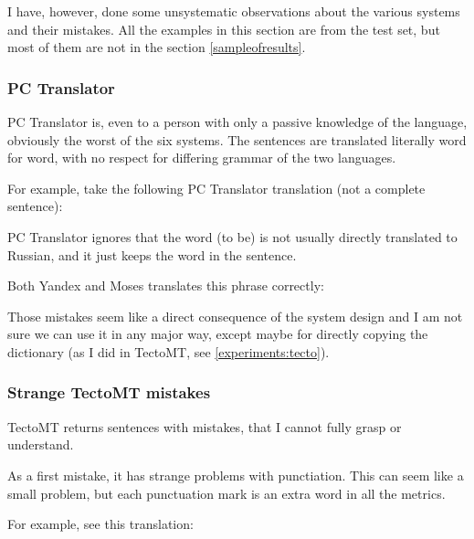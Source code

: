 I have, however, done some unsystematic observations about the various systems and their mistakes. All the examples in this section are from the test set, but most of them are not in the section \ref{sampleofresults}.
\subsubsection{PC Translator}
PC Translator is, even to a person with only a passive knowledge of the language, 
obviously the worst of the six systems. 
The sentences are translated literally word for word, with no respect for differing grammar of the two languages. 

For example, take the following PC Translator translation (not a complete sentence):

PC Translator ignores that the word  (to be) is not usually directly translated to Russian, and it just keeps the word in the sentence. 

Both Yandex and Moses translates this phrase correctly:

Those mistakes seem like a direct consequence of the system design and I am not sure we can use it in any major way, except maybe for directly copying the dictionary (as I did in TectoMT, see \ref{experiments:tecto}). 
\subsubsection{Strange TectoMT mistakes}
TectoMT returns sentences with  mistakes, that I cannot fully grasp or understand. 

As a first mistake, it has strange problems with punctiation. This can seem like a small problem, but each punctuation mark is an extra word in all the metrics.

For example, see this translation:


